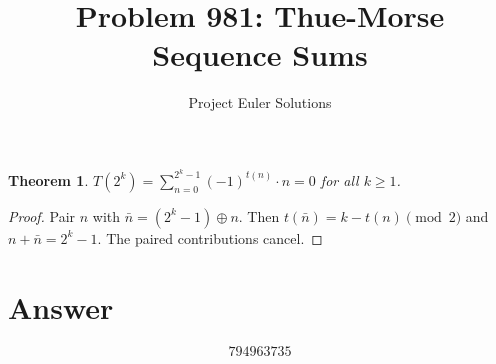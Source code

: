 \documentclass[11pt]{article}
\title{Problem 981: Thue-Morse Sequence Sums}
\author{Project Euler Solutions}
\date{}
\newtheorem{theorem}{Theorem}
\begin{document}
\maketitle
\begin{theorem}
$T(2^k) = \sum_{n=0}^{2^k-1}(-1)^{t(n)}\cdot n = 0$ for all $k \ge 1$.
\end{theorem}
\begin{proof}
Pair $n$ with $\bar n = (2^k-1)\oplus n$. Then $t(\bar n) = k - t(n) \pmod 2$ and $n + \bar n = 2^k - 1$. The paired contributions cancel.
\end{proof}
\section{Answer}

\[
\boxed{794963735}
\]
\end{document}
